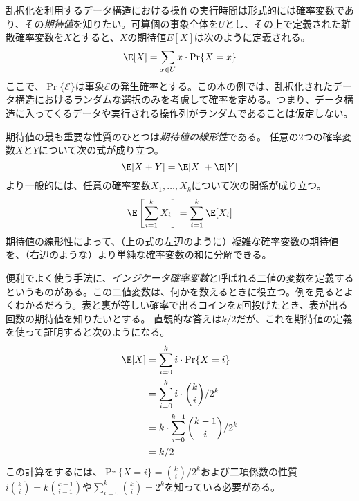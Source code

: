 乱択化を利用するデータ構造における操作の実行時間は形式的には確率変数であり、その\emph{期待値}を知りたい。可算個の事象全体を$U$とし、その上で定義された離散確率変数を$X$とすると、$X$の期待値$E[X]$は次のように定義される。
%
\[
    \E[X] = \sum_{x\in U} x\cdot\Pr\{X=x\}
\]
ここで、$\Pr\{\mathcal{E}\}$は事象$\mathcal{E}$の発生確率とする。この本の例では、乱択化されたデータ構造におけるランダムな選択のみを考慮して確率を定める。つまり、データ構造に入ってくるデータや実行される操作列がランダムであることは仮定しない。

期待値の最も重要な性質のひとつは\emph{期待値の線形性}である。
%
任意の2つの確率変数$X$と$Y$について次の式が成り立つ。
\[
   \E[X+Y] = \E[X] + \E[Y]
\]
より一般的には、任意の確率変数$ X_1,\ldots,X_k $について次の関係が成り立つ。
\[
   \E\left[\sum_{i=1}^k X_i\right] = \sum_{i=1}^k \E[X_i]
\]
期待値の線形性によって、（上の式の左辺のように）複雑な確率変数の期待値を、（右辺のような）より単純な確率変数の和に分解できる。

便利でよく使う手法に、\emph{インジケータ確率変数}と呼ばれる二値の変数を定義するというものがある。この二値変数は、何かを数えるときに役立つ。例を見るとよくわかるだろう。表と裏が等しい確率で出るコインを$k$回投げたとき、表が出る回数の期待値を知りたいとする。
直観的な答えは$k/2$だが、これを期待値の定義を使って証明すると次のようになる。
\begin{align*}
   \E[X] & = \sum_{i=0}^k i\cdot\Pr\{X=i\} \\
         & = \sum_{i=0}^k i\cdot\binom{k}{i}/2^k \\
         & = k\cdot \sum_{i=0}^{k-1}\binom{k-1}{i}/2^k \\
         & = k/2
\end{align*}
この計算をするには、$\Pr\{X=i\} = \binom{k}{i}/2^k$および二項係数の性質$i\binom{k}{i}=k\binom{k-1}{i-1}$や$\sum_{i=0}^{k} \binom{k}{i} = 2^{k}$を知っている必要がある。

